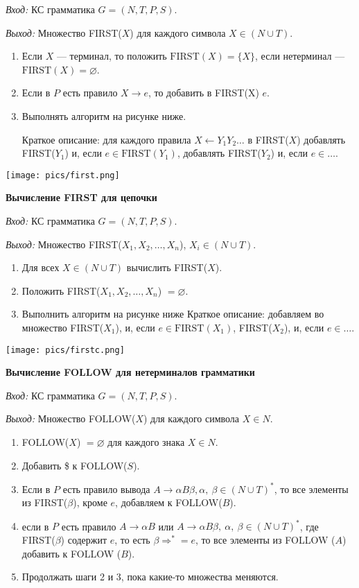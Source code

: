 \textit{Вход:} КС грамматика $G = (N, T, P, S)$.

\textit{Выход:} Множество FIRST($X$) для каждого символа $X \in (N \cup T)$.

\begin{enumerate}
    \item Если $X$ --- терминал, то положить $\text{FIRST}(X) = \{X\}$, если нетерминал --- $\text{FIRST}(X) = \varnothing$.
    \item Если в $P$ есть правило $X \rightarrow e$, то добавить в FIRST(X) $e$.
    \item Выполнять алгоритм на рисунке ниже.
    
    Краткое описание: для каждого правила $X \leftarrow Y_1 Y_2 \dots$ в FIRST($X$) добавлять FIRST($Y_1$) и, если $e \in \text{FIRST}(Y_1)$, добавлять FIRST($Y_2$) и, если $e \in \dots$. 
\end{enumerate}

\texttt{[image: pics/first.png]}

\textbf{Вычисление FIRST для цепочки}

\textit{Вход:} КС грамматика $G = (N, T, P, S)$.

\textit{Выход:} Множество FIRST($X_1, X_2, \dots, X_n$), $X_i \in (N \cup T)$.


\begin{enumerate}
    \item Для всех $X \in (N \cup T)$ вычислить FIRST($X$).
    \item Положить FIRST($X_1, X_2, \dots, X_n$) $ = \varnothing$.
    \item Выполнить алгоритм на рисунке ниже \newline
    Краткое описание: добавляем во множество FIRST($X_1$), и, если $e \in \text{FIRST}(X_1)$, FIRST($X_2$), и, если $e \in \dots$.
\end{enumerate}

\texttt{[image: pics/firstc.png]}

\textbf{Вычисление FOLLOW для нетерминалов грамматики}

\textit{Вход:} КС грамматика $G = (N, T, P, S)$.

\textit{Выход:} Множество FOLLOW($X$) для каждого символа $X \in N$.

\begin{enumerate}
    \item FOLLOW($X$) $= \varnothing$ для каждого знака $X \in N$.
    \item Добавить \$ к FOLLOW($S$).
    \item Если в $P$ есть правило вывода $A \rightarrow \alpha B \beta, \alpha,~\beta \in (N \cup T)^\ast$, то все элементы из FIRST($\beta$), кроме $e$, добавляем к FOLLOW($B$).
    \item если в $P$ есть правило $A \rightarrow \alpha B$ или $A \rightarrow \alpha B \beta,~\alpha,~\beta \in (N \cup T)^\ast$, где FIRST($\beta$) содержит $e$, то есть $\beta \Rightarrow^\ast = e$, то все элементы из FOLLOW ($A$) добавить к FOLLOW ($B$).
    \item Продолжать шаги 2 и 3, пока какие-то множества меняются.
\end{enumerate}


